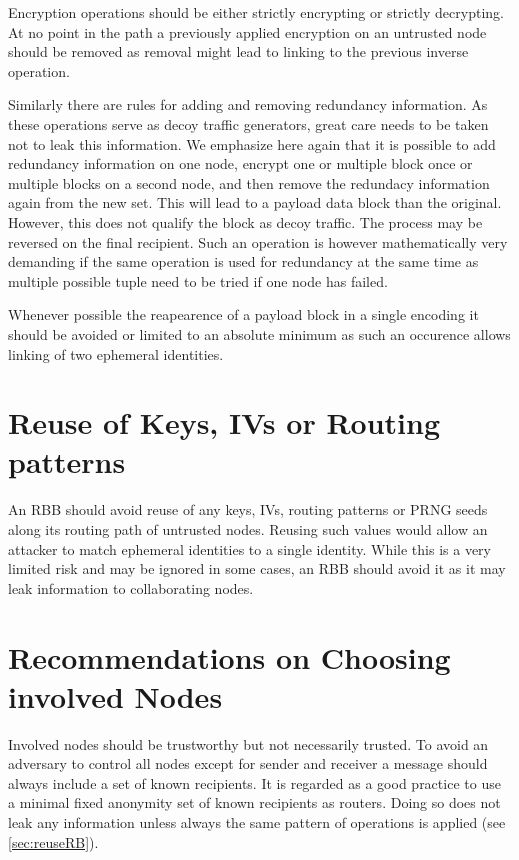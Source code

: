 Encryption operations should be either strictly encrypting or strictly decrypting. At no point in the path a previously applied encryption on an untrusted node should be removed as removal might lead to linking to the previous inverse operation.

Similarly there are rules for adding and removing redundancy information. As these operations serve as decoy traffic generators, great care needs to be taken not to leak this information. We emphasize here again that it is possible to add redundancy information on one node, encrypt one or multiple block once or multiple blocks on a second node, and then remove the redundacy information again from the new set. This will lead to a payload data block than the original. However, this does not qualify the block as decoy traffic. The process may be reversed on the final recipient. Such an operation is however mathematically very demanding if the same operation is used for redundancy at the same time as multiple possible tuple need to be tried if one node has failed.

Whenever possible the reapearence of a payload block in a single encoding it should be avoided or limited to an absolute minimum as such an occurence allows linking of two ephemeral identities.

\section{Reuse of Keys, IVs or Routing patterns}
An RBB should avoid reuse of any keys, IVs, routing patterns or PRNG seeds along its routing path of untrusted nodes. Reusing such values would allow an attacker to match ephemeral identities to a single identity. While this is a very limited risk and may be ignored in some cases, an RBB should avoid it as it may leak information to collaborating nodes.

\section{Recommendations on Choosing involved Nodes}
Involved nodes should be trustworthy but not necessarily trusted. To avoid an adversary to control all nodes except for sender and receiver a message should always include a set of known recipients. It is regarded as a good practice to use a minimal fixed anonymity set of known recipients as routers. Doing so does not leak any information unless always the same pattern of operations is applied (see \ref{sec:reuseRB}).

